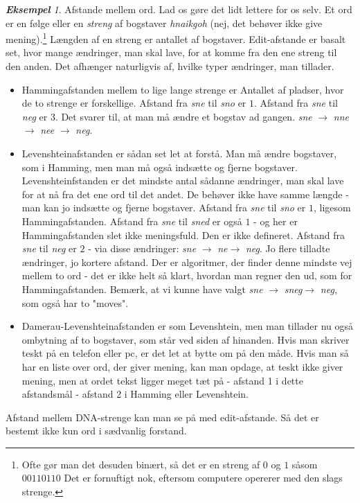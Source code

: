 \documentclass[a4paper, 12pt]{article}
\theoremstyle{remark}
\newtheorem{Eksempel}{\textbf{Eksempel}}
\begin{document}
\begin{Eksempel}
Afstande mellem ord. Lad os gøre det lidt lettere for os selv. 
Et ord er en følge eller en \emph{streng} af bogstaver \emph{hnaikgoh} (nej, det behøver ikke give mening).\footnote{Ofte gør man det desuden binært, så det er en streng af $0$ og $1$ såsom $00110110$ Det er fornuftigt nok, eftersom computere opererer med den slags strenge.}
 Længden af en streng er antallet af bogstaver.
Edit-afstande er basalt set, hvor mange ændringer, man skal lave, for at komme fra den ene streng til den anden. Det afhænger naturligvis af, hvilke typer ændringer, man tillader. 
\begin{itemize}
\item Hammingafstanden mellem to lige lange strenge er Antallet af pladser, hvor de to strenge er forskellige. 
Afstand fra \emph{sne} til \emph{sno} er $1$. Afstand fra \emph{sne} til \emph{neg} er $3$. 
Det svarer til, at man må ændre et bogstav ad gangen. \emph{sne} $\rightarrow$ \emph{nne} $\rightarrow$ \emph{nee} $\rightarrow$ \emph{neg}.
\item Levenshteinafstanden er sådan set let at forstå. 
Man må ændre bogstaver, som i Hamming, men man må også indsætte og fjerne bogstaver. 
Levenshteinfstanden er det mindste antal sådanne ændringer, man skal  lave for at nå fra det ene ord til det andet. 
De behøver ikke have samme længde - man kan jo indsætte og fjerne bogstaver. 
Afstand fra  \emph{sne} til \emph{sno} er $1$, ligesom Hammingafstanden. 
Afstand fra \emph{sne} til \emph{sned} er også $1$ - og her er Hammingafstanden slet ikke meningsfuld. Den er ikke defineret.
Afstand fra \emph{sne} til \emph{neg} er $2$ - via disse ændringer: \emph{sne} $\rightarrow$ \emph{ne}$\rightarrow$ \emph{neg}. 
Jo flere tilladte ændringer, jo kortere afstand. Der er algoritmer, der finder denne mindste vej mellem to ord - det er ikke helt så klart, hvordan man regner den ud, som for Hammingafstanden.
 Bemærk, at vi kunne have valgt \emph{sne} $\rightarrow$ \emph{sneg}$\rightarrow$ \emph{neg}, som også har to "moves". 
\item Damerau-Levenshteinafstanden er som Levenshtein, men man tillader nu også ombytning af to bogstaver, som står ved siden af hinanden. 
Hvis man skriver teskt på en telefon eller pc, er det let at bytte om på den måde. 
Hvis man så har en liste over ord, der giver mening, kan man opdage, at teskt ikke giver mening, men at ordet tekst ligger meget tæt på - afstand 1 i dette afstandsmål - afstand 2 i Hamming eller Levenshtein.
\end{itemize}
Afstand mellem DNA-strenge kan man se på med edit-afstande. Så det er bestemt ikke kun ord i sædvanlig forstand. 
\end{Eksempel}
\end{document}
